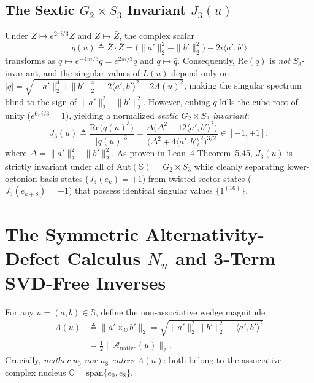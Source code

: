 \documentclass[journal,twoside]{IEEEtran}
\theoremstyle{definition}
\theoremstyle{remark}
\newcommand{\C}{\mathbb{C}}
\newcommand{\Oc}{\mathbb{O}}
\newcommand{\Se}{\mathbb{S}}
\newcommand{\RePart}{\mathrm{Re}}
\newcommand{\Anative}{\mathcal{A}_{\mathrm{native}}}
\newcommand{\Aut}{\mathrm{Aut}}
\begin{document}
\subsection{The Sextic $G_2 \times S_3$ Invariant $J_3(u)$}
Under $Z \mapsto e^{2\pi i/3} Z$ and $Z \mapsto \bar{Z}$, the complex scalar
\begin{equation}
    q(u) \triangleq \bar{Z}\cdot \bar{Z} = \bigl(\|a'\|_2^2 - \|b'\|_2^2\bigr) - 2i\langle a', b'\rangle
\end{equation}
transforms as $q \mapsto e^{-4\pi i/3} q = e^{2\pi i/3} q$ and $q \mapsto \bar{q}$. Consequently, $\RePart(q)$ is \emph{not} $S_3$-invariant, and the singular values of $L(u)$ depend only on $|q| = \sqrt{\|a'\|_2^4 + \|b'\|_2^4 + 2\langle a',b'\rangle^2 - 2\Lambda(u)^2}$, making the singular spectrum blind to the sign of $\|a'\|_2^2 - \|b'\|_2^2$. However, cubing $q$ kills the cube root of unity ($e^{6\pi i/3} = 1$), yielding a normalized \emph{sextic $G_2 \times S_3$ invariant}:
\begin{equation}
    J_3(u) \triangleq \frac{\RePart\bigl(q(u)^3\bigr)}{|q(u)|^3} = \frac{\Delta\bigl(\Delta^2 - 12\langle a', b'\rangle^2\bigr)}{\bigl(\Delta^2 + 4\langle a', b'\rangle^2\bigr)^{3/2}} \in [-1, +1],
    \label{eq:j3_def}
\end{equation}
where $\Delta = \|a'\|_2^2 - \|b'\|_2^2$. As proven in Lean~4 Theorem~5.45, $J_3(u)$ is strictly invariant under all of $\Aut(\Se) = G_2 \times S_3$ while cleanly separating lower-octonion basis states ($J_3(e_k) = +1$) from twisted-sector states ($J_3(e_{k+8}) = -1$) that possess identical singular values $\{1^{(16)}\}$.

\section{The Symmetric Alternativity-Defect Calculus $N_u$ and 3-Term SVD-Free Inverses}
\label{sec:nu_calculus}
For any $u = (a, b) \in \Se$, define the non-associative wedge magnitude
\begin{equation}
\begin{aligned}
    \Lambda(u) &\triangleq \|a' \times_{\Oc} b'\|_2 = \sqrt{\|a'\|_2^2 \|b'\|_2^2 - \langle a', b'\rangle^2} \\
               &= \tfrac{1}{2}\|\Anative(u)\|_2.
\end{aligned}
\end{equation}
Crucially, \emph{neither $u_0$ nor $u_8$ enters $\Lambda(u)$}: both belong to the associative complex nucleus $\C = \mathrm{span}\{e_0, e_8\}$.
\end{document}

